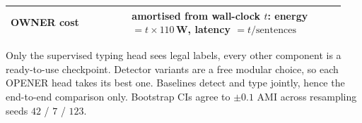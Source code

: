 \begin{table}[H]
\begin{threeparttable}
\begin{tabular}{@{}p{0.34\linewidth}p{0.60\linewidth}@{}}
OWNER cost & amortised from wall-clock $t$: energy $=t\times110$\,W, latency $=t/\text{sentences}$ \\
\bottomrule
\end{tabular}
\begin{tablenotes}[flushleft]
\scriptsize
\item Only the supervised typing head sees legal labels, every other component is a ready-to-use checkpoint. Detector variants are a free modular choice, so each OPENER head takes its best one. Baselines detect and type jointly, hence the end-to-end comparison only. Bootstrap CIs agree to ${\pm}0.1$ AMI across resampling seeds $42$ / $7$ / $123$.
\end{tablenotes}
\end{threeparttable}
\end{table}


